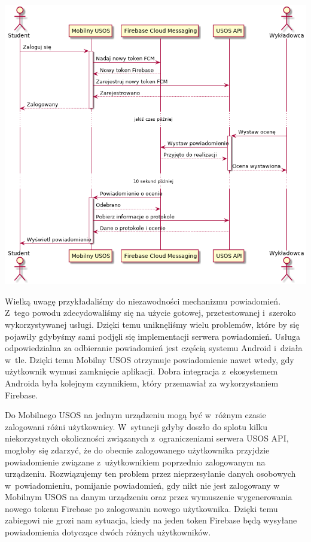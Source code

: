 \documentclass{pracamgr}
\begin{document}
\begingroup
\centering
\includegraphics[width=\linewidth]{img/firebase.png}
\label{fig:firebase}
\medskip
\endgroup

Wielką uwagę przykładaliśmy do niezawodności mechanizmu powiadomień. Z~tego powodu
zdecydowaliśmy się na użycie gotowej, przetestowanej i~szeroko wykorzystywanej
usługi. Dzięki temu uniknęliśmy wielu problemów, które by się pojawiły gdybyśmy
sami podjęli się implementacji serwera powiadomień. Usługa odpowiedzialna za
odbieranie powiadomień jest częścią systemu Android i~działa w~tle. Dzięki temu
Mobilny USOS otrzymuje powiadomienie nawet wtedy, gdy użytkownik wymusi zamknięcie
aplikacji. Dobra integracja z~ekosystemem Androida była kolejnym czynnikiem, który
przemawiał za wykorzystaniem Firebase.

Do Mobilnego USOS na jednym urządzeniu mogą być w~różnym czasie zalogowani różni
użytkownicy. W~sytuacji gdyby doszło do splotu kilku niekorzystnych okoliczności
związanych z~ograniczeniami serwera USOS API, mogłoby się zdarzyć, że do obecnie
zalogowanego użytkownika przyjdzie powiadomienie związane z~użytkownikiem poprzednio zalogowanym
na urządzeniu. Rozwiązujemy ten problem przez nieprzesyłanie danych
osobowych w~powiadomieniu, pomijanie powiadomień, gdy nikt nie jest zalogowany w
Mobilnym USOS na danym urządzeniu oraz przez wymuszenie wygenerowania nowego tokenu
Firebase po zalogowaniu nowego użytkownika. Dzięki temu zabiegowi nie grozi nam
sytuacja, kiedy na jeden token Firebase będą wysyłane powiadomienia dotyczące dwóch
różnych użytkowników.
\end{document}

